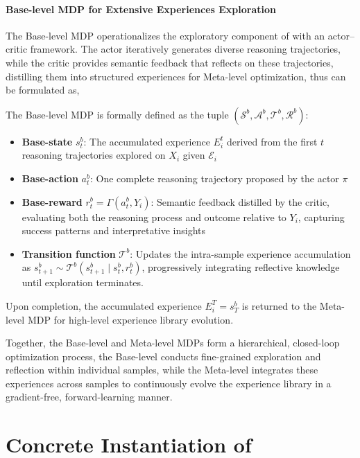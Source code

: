\paragraph{Base-level MDP for Extensive Experiences Exploration} 
The Base-level MDP operationalizes the exploratory component of \method{} with an actor–critic framework. The actor iteratively generates diverse reasoning trajectories, while the critic provides semantic feedback that reflects on these trajectories, distilling them into structured experiences for Meta-level optimization, thus can be formulated as,
\begin{definition}
The Base-level MDP is formally defined as the tuple $(\mathcal{S}^{b}, \mathcal{A}^{b}, \mathcal{T}^{b}, \mathcal{R}^{b})$:
\begin{itemize}
    \item \textbf{Base-state} $s^{b}_t$: The accumulated experience ${E^t_i}$ derived from the first $t$ reasoning trajectories explored on $X_i$ given $\mathcal{E}_i$
    \item \textbf{Base-action} $a^{b}_{t}$: One complete reasoning trajectory proposed by the actor $\pi$
    \item \textbf{Base-reward} $r^{b}_{t}=\Gamma(a^{b}_t,Y_i)$: Semantic feedback distilled by the critic, evaluating both the reasoning process and outcome relative to $Y_i$, capturing success patterns and interpretative insights
    \item \textbf{Transition function} $\mathcal{T}^{b}$: Updates the intra-sample experience accumulation as $s^{b}_{t+1} \sim \mathcal{T}^{b}(s^{b}_{t+1}\mid s^{b}_{t},r^{b}_{t})$, progressively integrating reflective knowledge until exploration terminates.
\end{itemize}
\end{definition}

Upon completion, the accumulated experience $E^T_i = s^{b}_T$ is returned to the Meta-level MDP for high-level experience library evolution.

Together, the Base-level and Meta-level MDPs form a hierarchical, closed-loop optimization process, the Base-level conducts fine-grained exploration and reflection within individual samples, while the Meta-level integrates these experiences across samples to continuously evolve the experience library in a gradient-free, forward-learning manner.


\section{Concrete Instantiation of \method{}}


